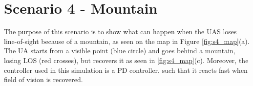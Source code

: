 \newpage
\section{Scenario 4 - Mountain}\label{sec:scenario4}
The purpose of this scenario is to show what can happen when the UAS loses line-of-sight because of a mountain, as seen on the map in Figure \ref{fig:s4_map}(a). The UA starts from a visible point (blue circle) and goes behind a mountain, losing LOS (red crosses), but recovers it as seen in \ref{fig:s4_map}(c). Moreover, the controller used in this simulation is a PD controller, such that it reacts fast when field of vision is recovered.

\begin{figure}[H]
	\centering

\end{figure}
